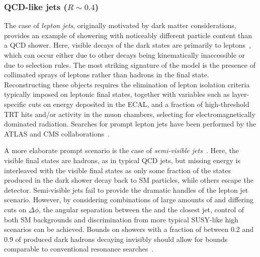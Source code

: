 \subsubsection{QCD-like jets ($R \sim 0.4$)} %
\label{sec:darkshowerthinjet}

The case of \emph{lepton jets}, originally motivated by dark matter considerations, provides an example of showering with noticeably different particle content than a QCD shower. Here, visible decays of the dark states are primarily to leptons~\cite{Falkowski:2010cm,Falkowski:2010gv}, which can occur either due to other decays being kinematically inaccessible or due to selection rules. The most striking signature of the model is the presence of collimated sprays of leptons rather than hadrons in the final state. Reconstructing these objects requires the elimination of lepton isolation criteria typically imposed on leptonic final states, together with variables such as layer-specific cuts on energy deposited in the ECAL, and a fraction of high-threshold TRT hits and/or activity in the muon chambers, selecting for electromagnetically dominated radiation. Searches for prompt lepton jets have been performed by the ATLAS and CMS collaborations~\cite{Chatrchyan:2011hr,Aad:2015sms}.

A more elaborate prompt scenario is the case of \emph{semi-visible jets}~\cite{Cohen:2015toa}. Here, the visible final states are hadrons, as in typical QCD jets, but missing energy is interleaved with the visible final states as only some fraction of the states produced in the dark shower decay back to SM particles, while others escape the detector. Semi-visible jets fail to provide the dramatic handles of the lepton jet scenario. However, by considering combinations of large amounts of \MET and differing cuts on $\Delta\phi$, the angular separation between the \MET and the closest jet, control of both SM backgrounds and discrimination from more typical SUSY-like high \MET scenarios can be achieved. Bounds on showers with a fraction of between 0.2 and 0.9 of produced dark hadrons decaying invisibly should allow for bounds comparable to conventional resonance searches~\cite{Cohen:2017pzm}.

